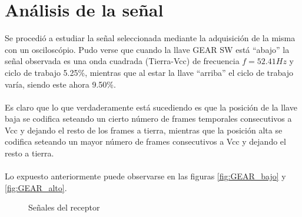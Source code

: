 \documentclass[main]{subfiles}
\begin{document}
\section{Análisis de la señal}

Se procedió a estudiar la señal seleccionada mediante la adquisición de la misma con un osciloscópio. Pudo verse que cuando la llave GEAR SW está ``abajo'' la señal observada es una onda cuadrada (Tierra-Vcc) de frecuencia $f=52.41Hz$ y ciclo de trabajo 5.25\%, mientras que al estar la llave ``arriba'' el ciclo de trabajo varía, siendo este ahora 9.50\%.\\
\\
Es claro que lo que verdaderamente está sucediendo es que la posición de la llave baja se codifica seteando un cierto número de  frames temporales consecutivos a Vcc y dejando el resto de los frames a tierra, mientras que la posición alta se codifica seteando un mayor número de frames consecutivos a Vcc y dejando el resto a tierra.\\
\\
Lo expuesto anteriormente puede observarse en las figuras \ref{fig:GEAR_bajo} y \ref{fig:GEAR_alto}.

\begin{figure}
\centering
  \caption{Se\~nales del receptor}
  \label{fig:senal_switcheo}
\end{figure}
%
%
\end{document}

